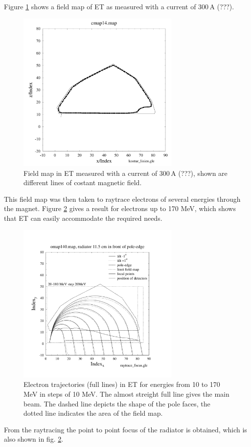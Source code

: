\documentclass[11pt]{book}
\begin{document}
Figure \ref{map14} shows a field map of ET as measured with a current of
300\,A (???). \\
\begin{figure}
\begin{center}
\includegraphics[height=8cm]{./et_map14}
\vspace*{-1cm}
\end{center}
\caption[*]{Field map in ET measured with a current of 300\,A (???),
shown are different lines of costant magnetic field.}
\label{map14}
\end{figure}
This field map was then taken to raytrace electrons of several energies
through the magnet. Figure \ref{trajet} gives a result for electrons
up to 170 MeV, which shows that ET can easily accommodate the 
required needs.\\
\begin{figure}
\vspace*{-1cm}
\begin{center}
\includegraphics[height=8cm]{./et_traj}
\end{center}
\caption{Electron trajectories (full lines) in ET for energies from 
10 to 170 MeV
in steps of 10 MeV. The almost streight full line gives the main beam.
The dashed line depicts the shape of the pole faces, the dotted line 
indicates the area of the field map.}
\label{trajet}
\end{figure}

From the raytracing the point to point focus of the radiator is obtained,
which is also shown in fig. \ref{trajet}.
\end{document}
